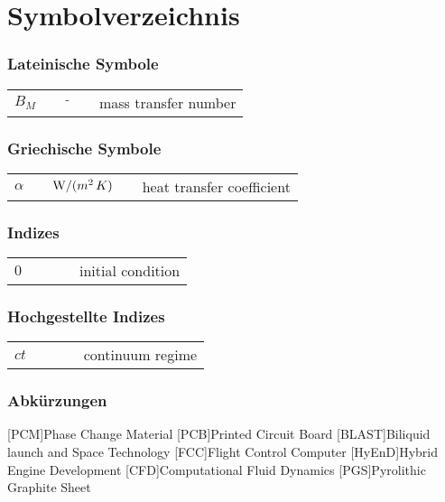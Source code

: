 \chapter*{Symbolverzeichnis}
	
\subsection*{Lateinische Symbole}

\begin{supertabular}{p{10mm}p{3mm}p{20mm}p{3mm}l}
$B_M$						& &	${\textrm - }$										&	&		mass transfer number\\
\end{supertabular}


\subsection*{Griechische Symbole}

\begin{supertabular}{p{10mm}p{3mm}p{20mm}p{3mm}l}
$\alpha$				& &	${\textrm W/(m^2\,K)}$					&	&		heat transfer coefficient\\
\end{supertabular} 


\subsection*{Indizes}

\begin{supertabular}{p{10mm}p{3mm}p{20mm}p{3mm}l}
$0$							& &																&	&		initial condition\\
\end{supertabular} 


\subsection*{Hochgestellte Indizes}

\begin{supertabular}{p{10mm}p{3mm}p{20mm}p{3mm}l}
$ct$						& &																&	&		continuum regime\\
\end{supertabular} 

\newpage

\subsection*{Abkürzungen}
\begin{acronym}[BLAST]
[PCM]{Phase Change Material}
[PCB]{Printed Circuit Board}
[BLAST]{Biliquid launch and Space Technology}
[FCC]{Flight Control Computer}
[HyEnD]{Hybrid Engine Development}
[CFD]{Computational Fluid Dynamics}
[PGS]{Pyrolithic Graphite Sheet}
\end{acronym}